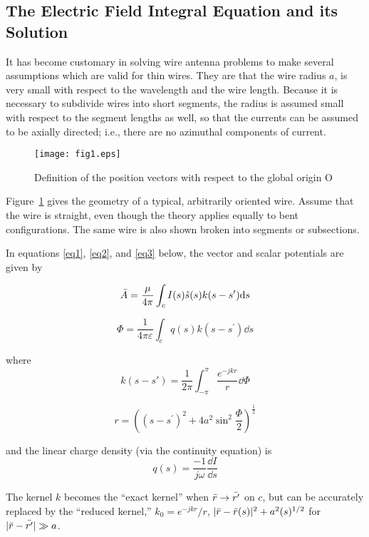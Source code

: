 \documentclass[12pt]{article}
\begin{document}
\subsection{The Electric Field Integral Equation and its Solution}
It has become customary in solving wire antenna problems to make several
assumptions which are valid for thin wires. They are that the wire
radius $a$, is very small with respect to the wavelength and the wire
length. Because it is necessary to subdivide wires into short segments,
the radius is assumed small with respect to the segment lengths as well,
so that the currents can be assumed to be axially directed; i.e., there
are no azimuthal components of current.

\begin{figure}[htb]
\centerline{\texttt{[image: fig1.eps]}}
\caption{Definition of the position vectors with respect to the global
origin O}
\label{fig1}
\end{figure}
\afterpage\clearpage

Figure~\ref{fig1} gives the geometry of a typical, arbitrarily oriented
wire. Assume that the wire is straight, even though the theory applies
equally to bent configurations. The same wire is also shown broken into
segments or subsections.

In equations \eqref{eq1}, \eqref{eq2}, and \eqref{eq3} below, the vector and
scalar potentials are given by

\begin{equation}
\bar{A} = \frac{\mu}{4\pi} \int_c I(s)\hat{s}(s)k(s-s^\prime)\mathrm{d}s
\label{eq1}
\end{equation}

\begin{equation}
\Phi = \frac{1}{4\pi\varepsilon} \int_c q(s)k(s-s^\prime)\dd{s}
\label{eq2}
\end{equation}

where
\[ k(s-s\prime) = \frac{1}{2\pi}\int_{-\pi}^{\pi} \frac{e^{-jkr}}{r}\dd{\Phi}
\]

\[ r = ((s-s^\prime)^2 + 4a^2\sin^2\frac{\Phi}{2})^{\frac{1}{2}}
\]

and the linear charge density (via the continuity equation) is
\begin{equation}
q(s) = \frac{-1}{j\omega}\frac{\dd{I}}{\dd{s}}
\label{eq3}
\end{equation}

The kernel $k$ becomes the ``exact kernel'' when
$\bar{r}\rightarrow\bar{r^\prime}$ on $c$, but can be accurately
replaced by the ``reduced kernel,''
$k_0 = e^{-jkr}/r$, $|\bar{r} - \bar{r}(s)|^2+a^2(s)^{1/2}$
for $|\bar{r}-\bar{r^\prime}| \gg a$.
\end{document}
